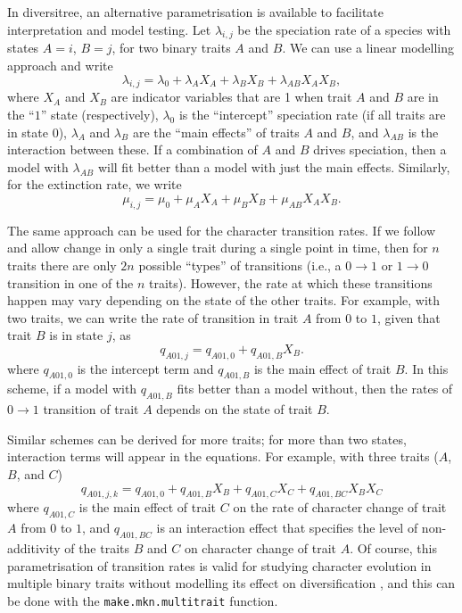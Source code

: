 \documentclass[12pt]{article}
\newcommand\code\texttt
\begin{document}
In diversitree, an alternative parametrisation is available to
facilitate interpretation and model testing.  Let $\lambda_{i,j}$ be
the speciation rate of a species with states $A=i$, $B=j$, for two
binary traits $A$ and $B$.  We can use a linear modelling approach and
write
\begin{equation}
  \label{eq:lambda}
  \lambda_{i,j} = \lambda_0 + \lambda_A X_A  + \lambda_B X_B +
  \lambda_{AB} X_A X_B,
\end{equation}
where $X_A$ and $X_B$ are indicator variables that are 1 when trait
$A$ and $B$ are in the ``$1$'' state (respectively), $\lambda_0$ is
the ``intercept'' speciation rate (if all traits are in state $0$),
$\lambda_A$ and $\lambda_B$ are the ``main effects'' of traits $A$ and
$B$, and $\lambda_{AB}$ is the interaction between these.  If a
combination of $A$ and $B$ drives speciation, then a model with
$\lambda_{AB}$ will fit better than a model with just the main
effects.  Similarly, for the extinction rate, we write
\begin{equation}
  \label{eq:mu}
  \mu_{i,j} = \mu_0 + \mu_A X_A  + \mu_B X_B  +
  \mu_{AB} X_A X_B.
\end{equation}

The same approach can be used for the character transition rates.  If
we follow \citet{Pagel-1994-37} and allow change in only a single
trait during a single point in time, then for $n$ traits there are
only $2n$ possible ``types'' of transitions (i.e., a $0\to1$ or
$1\to0$ transition in one of the $n$ traits).  However, the rate at
which these transitions happen may vary depending on the state of the
other traits.  For example, with two traits, we can write the rate of
transition in trait $A$ from $0$ to $1$, given that trait $B$ is in
state $j$, as
\begin{equation}
  \label{eq:q}
  q_{A01,  j} = q_{A01,0} + q_{A01,B} X_B.
\end{equation}
where $q_{A01,0}$ is the intercept term and $q_{A01,B}$ is the
main effect of trait $B$.
%
In this scheme, if a model with $q_{A01,B}$ fits better than a
model without, then the rates of $0\to1$ transition of trait $A$
depends on the state of trait $B$.

Similar schemes can be derived for more traits; for more than two
states, interaction terms will appear in the equations.  For example,
with three traits ($A$, $B$, and $C$)
\begin{equation}
  \label{eq:q3}
  q_{A01, j, k} = q_{A01,0} + q_{A01,B} X_B +
  q_{A01,C}X_C + q_{A01,BC}X_BX_C
\end{equation}
where $q_{A01,C}$ is the main effect of trait $C$ on the rate of
character change of trait $A$ from $0$ to $1$, and $q_{A01,BC}$ is
an interaction effect that specifies the level of non-additivity of the
traits $B$ and $C$ on character change of trait $A$.
%
Of course, this parametrisation of transition rates is valid for
studying character evolution in multiple binary traits without
modelling its effect on diversification \citep[as
in][]{Pagel-1994-37}, and this can be done with the
\code{make.mkn.multitrait} function.
\end{document}
